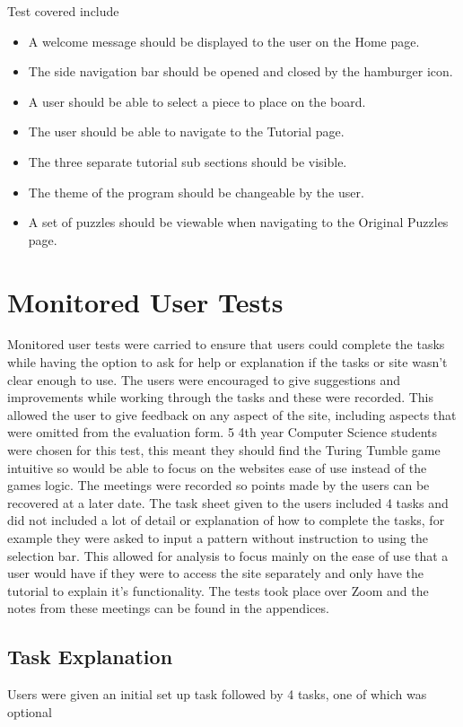 \documentclass{l4proj}
\begin{document}
Test covered include 
\begin{itemize}
    \item A welcome message should be displayed to the user on the Home page.
    \item The side navigation bar should be opened and closed by the hamburger icon.
    \item A user should be able to select a piece to place on the board.
    \item The user should be able to navigate to the Tutorial page.
    \item The three separate tutorial sub sections should be visible.
    \item The theme of the program should be changeable by the user.
    \item A set of puzzles should be viewable when navigating to the Original Puzzles page. 
\end{itemize}

\section{Monitored User Tests}
Monitored user tests were carried to ensure that users could complete the tasks while having the option to ask for help or explanation if the tasks or site wasn't clear enough to use. The users were encouraged to give suggestions and improvements while working through the tasks and these were recorded. This allowed the user to give feedback on any aspect of the site, including aspects that were omitted from the evaluation form. 5 4th year Computer Science students were chosen for this test, this meant they should find the Turing Tumble game intuitive so would be able to focus on the websites ease of use instead of the games logic. The meetings were recorded so points made by the users can be recovered at a later date. The task sheet given to the users included 4 tasks and did not included a lot of detail or explanation of how to complete the tasks, for example they were asked to input a pattern without instruction to using the selection bar. This allowed for analysis to focus mainly on the ease of use that a user would have if they were to access the site separately and only have the tutorial to explain it's functionality. The tests took place over Zoom and the notes from these meetings can be found in the appendices.

\subsection{Task Explanation}
\label{taskExplanation}
Users were given an initial set up task followed by 4 tasks, one of which was optional
\end{document}
